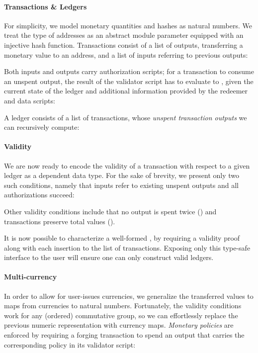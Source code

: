 \documentclass[sigplan,review,screen]{acmart}\settopmatter{printfolios=true,printccs=false,printacmref=false}
\begin{document}
\paragraph{Transactions \& Ledgers}
For simplicity, we model monetary quantities and hashes as natural numbers.
We treat the type of addresses as an abstract module parameter equipped with an injective hash function.
Transactions consist of a list of outputs, transferring a monetary value to an address, and a list of inputs
referring to previous outputs:
\basic{}

Both inputs and outputs carry authorization scripts; for a transaction to consume an unspent output, the
result of the validator script has to evaluate to \inlineTrue{}, given the current state of the ledger and
additional information provided by the redeemer and data scripts:
\auth{}

A ledger consists of a list of transactions, whose \textit{unspent transaction outputs} we can recursively compute:
\utxo{}

\paragraph{Validity}
We are now ready to encode the validity of a transaction with respect to a given ledger as a dependent data type.
For the sake of brevity, we present only two such conditions, namely that inputs refer to existing unspent outputs
and all authorizations succeed:

\valid{}
Other validity conditions include that no output is spent twice (\inlineNDS{})
and transactions preserve total values (\inlinePV{}).

It is now possible to characterize a well-formed \inlineLedger{},
by requiring a validity proof along with each insertion to the list of transactions.
Exposing only this type-safe interface to the user will ensure one can only construct valid ledgers.

\paragraph{Multi-currency}
In order to allow for user-issues currencies, we generalize the transferred values to maps from currencies to natural numbers.
Fortunately, the validity conditions work for any (ordered) commutative group, so we can effortlessly replace
the previous numeric representation with currency maps.
\textit{Monetary policies} are enforced by requiring a forging transaction to spend an output that carries the
corresponding policy in its validator script:
\multicurrency{}
\end{document}
